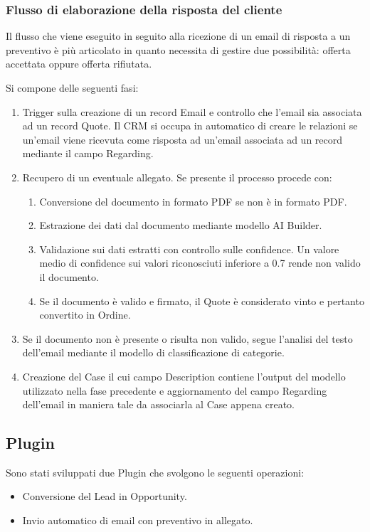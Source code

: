 \subsubsection{Flusso di elaborazione della risposta del cliente}
Il flusso che viene eseguito in seguito alla ricezione di un email di risposta a un preventivo è più articolato in quanto necessita di gestire due possibilità: offerta accettata oppure offerta rifiutata.

Si compone delle seguenti fasi:
\begin{enumerate}
  \item Trigger sulla creazione di un record Email e controllo che l'email sia associata ad un record Quote. Il CRM si occupa in automatico di creare le relazioni se un'email viene ricevuta come risposta ad un'email associata ad un record mediante il campo Regarding.
  \item Recupero di un eventuale allegato. Se presente il processo procede con:
  \begin{enumerate}
    \item Conversione del documento in formato PDF se non è in formato PDF.
    \item Estrazione dei dati dal documento mediante modello AI Builder.
    \item Validazione sui dati estratti con controllo sulle confidence. Un valore medio di confidence sui valori riconosciuti inferiore a \num{0.7} rende non valido il documento.
    \item Se il documento è valido e firmato, il Quote è considerato vinto e pertanto convertito in Ordine.
  \end{enumerate}
  \item Se il documento non è presente o risulta non valido, segue l'analisi del testo dell'email mediante il modello di classificazione di categorie.
  \item Creazione del Case il cui campo Description contiene l'output del modello utilizzato nella fase precedente e aggiornamento del campo Regarding dell'email in maniera tale da associarla al Case appena creato.
\end{enumerate}

\subsection{Plugin}
Sono stati sviluppati due Plugin che svolgono le seguenti operazioni: 
\begin{itemize}
  \item Conversione del Lead in Opportunity.
  \item Invio automatico di email con preventivo in allegato.
\end{itemize}

